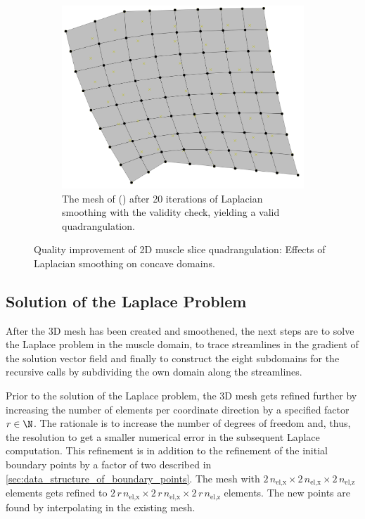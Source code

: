 \begin{figure}
  \quad
  \begin{subfigure}[t]{0.30\textwidth}%
    \centering%
    \includegraphics[width=\textwidth]{images/parallel_fiber_estimation/loop_025_p30402_world_mesh_improved.png}
    \caption{The mesh of () after 20 iterations of Laplacian smoothing with the validity check, yielding a valid quadrangulation.}%
    \label{fig:world_mesh_improved_1}%
  \end{subfigure}    
  \caption{Quality improvement of 2D muscle slice quadrangulation: Effects of Laplacian smoothing on concave domains.}%
  \label{fig:laplace_smoothing_0}%
\end{figure}%

\subsection{Solution of the Laplace Problem}\label{sec:solution_of_the_laplace_problem}

After the 3D mesh has been created and smoothened, the next steps are to solve the Laplace problem in the muscle domain, to trace streamlines in the gradient of the solution vector field and finally to construct the eight subdomains for the recursive calls by subdividing the own domain along the streamlines.

Prior to the solution of the Laplace problem, the 3D mesh gets refined further by increasing the number of elements per coordinate direction by a specified factor $r\in \N$. The rationale is to increase the number of degrees of freedom and, thus, the resolution to get a smaller numerical error in the subsequent Laplace computation.
This refinement is in addition to the refinement of the initial boundary points by a factor of two described in \cref{sec:data_structure_of_boundary_points}. The mesh with $2\,n_\text{el,x} \times 2\,n_\text{el,x} \times 2\,n_\text{el,z}$ elements gets refined to $2\,r\,n_\text{el,x} \times 2\,r\,n_\text{el,x} \times 2\,r\,n_\text{el,z}$ elements. The new points are found by interpolating in the existing mesh.

